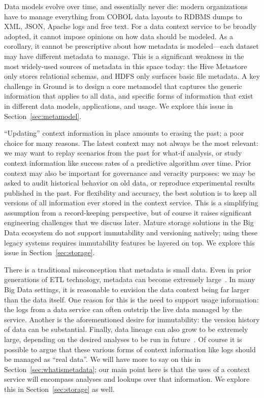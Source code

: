 \documentclass{sig-alternate}
\begin{document}
 Data models evolve over time, and essentially never die: modern organizations have to manage everything from COBOL data layouts to RDBMS dumps to XML, JSON, Apache logs and free text. For a data context service to be broadly adopted, it cannot impose opinions on how data should be modeled. As a corollary, it cannot be prescriptive about how metadata is modeled---each dataset may have different metadata to manage. This is a significant weakness in the most widely-used sources of metadata in this space today: the Hive Metastore only stores relational schemas, and HDFS only surfaces basic file metadata.  A key challenge in Ground is to design a core metamodel that captures the generic information that applies to all data, and specific forms of information that exist in different data models, applications, and usage. We explore this issue in Section~\ref{sec:metamodel}.

 ``Updating'' context information in place amounts to erasing the past; a poor choice for many reasons. The latest context may not always be the most relevant: we may want to replay scenarios from the past for what-if analysis, or study  context information like success rates of a predictive algorithm over time. Prior context may also be important for governance and veracity purposes: we may be asked to audit historical behavior on old data, or reproduce experimental results published in the past. For flexibility and accuracy, the best solution is to keep all versions of all information ever stored in the context service. This is a simplifying assumption from a record-keeping perspective, but of course it raises significant engineering challenges that we discuss later.  Mature storage solutions in the Big Data ecosystem do not support immutability and versioning natively; using these legacy systems requires immutability features be layered on top. We explore this issue in Section~\ref{sec:storage}.

 There is a traditional misconception that metadata is small data. Even in prior generations of ETL technology, metadata can become extremely large~\cite{informaticascale}. In many Big Data settings, it is reasonable to envision the data context being far larger than the data itself. One reason for this is the need to support usage information: the logs from a data service can often outstrip the live data managed by the service. Another is the aforementioned desire for immutability: the version history of data can be substantial. Finally, data lineage can also grow to be extremely large, depending on the desired analyses to be run in future~\cite{lineagesurvey}.  Of course it is possible to argue that these various forms of context information like logs should be managed as ``real data''.  We will have more to say on this in Section~\ref{sec:whatismetadata}; our main point here is that the uses of a context service will encompass analyses and lookups over that information.  We explore this in Section~\ref{sec:storage} as well.
\end{document}
